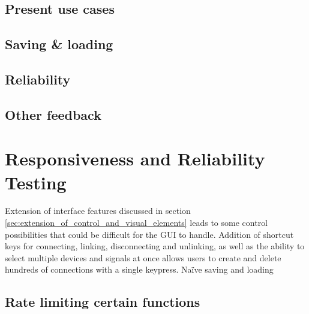 	\subsection{Present use cases} %
	\label{sub:present_use_cases}



	\subsection{Saving \& loading} %
	\label{sub:saving_and_loading}
	

	\subsection{Reliability} %
	\label{sub:reliability}
	

	\subsection{Other feedback} %
	\label{sub:other_feedback}
	
	

\section{Responsiveness and Reliability Testing} %
\label{sec:responsiveness_and_reliability_testing}

Extension of interface features discussed in section \ref{sec:extension_of_control_and_visual_elements} leads to some control possibilities that could be difficult for the GUI to handle. Addition of shortcut keys for connecting, linking, disconnecting and unlinking, as well as the ability to select multiple devices and signals at once allows users to create and delete hundreds of connections with a single keypress. Na\"{i}ve saving and loading 

	\subsection{Rate limiting certain functions} %
	\label{sub:rate_limiting_certain_functions}
	
